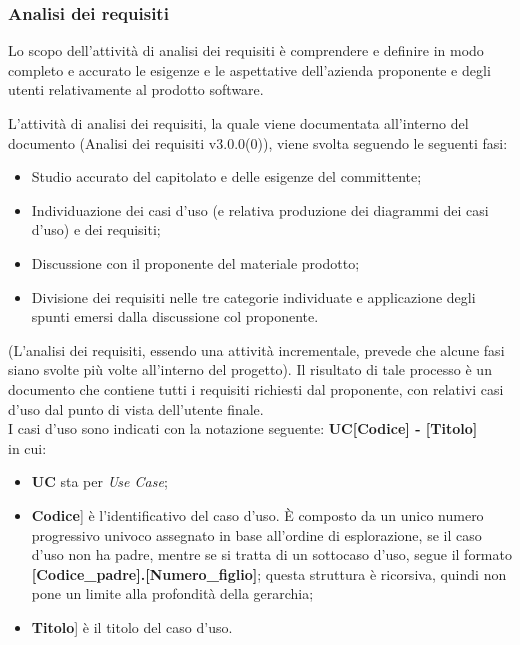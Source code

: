\documentclass[10pt, a4paper]{article}
\begin{document}
\subsubsection{Analisi dei requisiti}
Lo scopo dell'attività di analisi dei requisiti è comprendere e definire in modo completo e accurato le esigenze e le aspettative dell'azienda proponente e degli utenti 
relativamente al prodotto software.

L'attività di analisi dei requisiti, la quale viene documentata all'interno del documento (Analisi dei requisiti v3.0.0(0)), viene svolta seguendo le seguenti fasi:
\begin{itemize}
    \item Studio accurato del capitolato e delle esigenze del committente;
    \item Individuazione dei casi d'uso (e relativa produzione dei diagrammi dei casi d'uso) e dei requisiti;
    \item Discussione con il proponente del materiale prodotto;
    \item Divisione dei requisiti nelle tre categorie individuate e applicazione degli spunti emersi dalla discussione col proponente.
\end{itemize}
(L'analisi dei requisiti, essendo una attività incrementale, prevede che alcune fasi siano svolte più volte all'interno del progetto).
Il risultato di tale processo è un documento che contiene tutti i requisiti richiesti dal proponente, con relativi casi d'uso dal punto di vista dell'utente finale.\\

I casi d'uso sono indicati con la notazione seguente: \textbf{UC[Codice] - [Titolo]}\\
in cui:
\begin{itemize}
\item \textbf{UC} sta per \textit{Use Case\pg};
\item \lbrack \textbf{Codice}] è l'identificativo del caso d'uso. È composto da un unico numero progressivo univoco assegnato in base all'ordine di esplorazione, se il caso d'uso non ha padre, mentre se si tratta di un sottocaso d'uso, segue il formato \textbf{[Codice\_padre].[Numero\_figlio]}; questa struttura è ricorsiva, quindi non pone un limite alla profondità della gerarchia;
\item \lbrack \textbf{Titolo}] è il titolo del caso d'uso.
\end{itemize}
\end{document}

